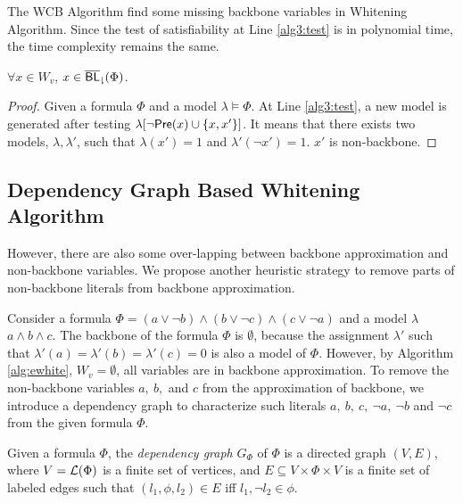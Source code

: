 The WCB Algorithm find some missing backbone variables in Whitening Algorithm. Since the test of satisfiability at Line \ref{alg3:test} is in polynomial time, the time complexity remains the same.

\begin{theorem}
$\forall x\in W_v$, $x\in{\sf \overline{BL}_\downharpoonright}(\Phi)$.
\end{theorem}

\begin{proof}
Given a formula $\Phi$ and a model $\lambda\models\Phi$. At Line \ref{alg3:test}, a new model is generated after testing $\lambda[\neg \textsf{Pre}(x)\cup \{x,x'\}]$. It means that there exists two models, $\lambda,\lambda'$, such that $\lambda(x')=1$ and $\lambda'(\neg x')=1$. $x'$ is non-backbone.
\end{proof}
\medskip


\iffalse
\subsection{Dependency Graph Based Whitening Algorithm}

However, there are also some over-lapping between backbone approximation and non-backbone variables. We propose another heuristic strategy to remove parts of non-backbone literals from backbone approximation.

Consider a formula $\Phi=(a\vee\neg b)\wedge(b\vee\neg c)\wedge(c\vee\neg a)$ and a model $\lambda$ $a\wedge b\wedge c$. The backbone of the formula $\Phi$ is $\emptyset$, because the assignment $\lambda'$ such that $\lambda'(a)=\lambda'(b)=\lambda'(c)=0$ is also a model of $\Phi$.
However, by Algorithm \ref{alg:ewhite}, $W_v=\emptyset$, all variables are in backbone approximation. To remove the non-backbone variables $a, \ b, $ and $c$ from the approximation of backbone, we introduce a dependency graph to characterize such literals $a, \ b, \ c, \ \neg a, \ \neg b$ and  $\neg c$ from  the given formula $\Phi$.

Given a formula $\Phi$, the \emph{dependency graph} $G_\Phi$ of $\Phi$ is a directed graph $(V,E)$, where
$V=\Lit(\Phi)$ is a finite set of vertices, and $E\subseteq V\times \Phi\times V$ is a finite set of labeled edges such that
$(l_1,\phi, l_2)\in E$ iff $l_1,\neg l_2\in \phi$.

